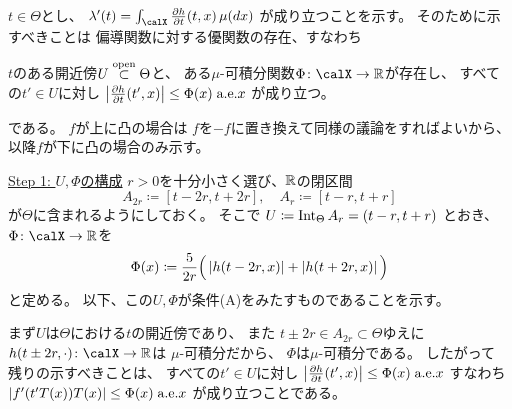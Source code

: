 \documentclass[report]{jlreq}
\begin{document}
\begin{answer}
    $t \in \Theta$とし、
    $\lambda'(t) = \int_\calX \deldel[h]{t} (t, x) \, \mu(dx)$
    が成り立つことを示す。
    そのために示すべきことは
    偏導関数に対する優関数の存在、すなわち
    \begin{description}
        \vspace{-1em}
        \item[(A)] $t$のある開近傍$U \stackrel{\text{open}}{\subset} \Theta$と、
            ある$\mu$-可積分関数$\Phi \colon \calX \to \R$が存在し、
            すべての$t' \in U$に対し
            $\myabs{
                \deldel[h]{t}(t', x)
            } \le \Phi(x) \; \text{a.e.$x$}$
            が成り立つ。
    \end{description}
    である。
    $f$が上に凸の場合は
    $f$を$-f$に置き換えて同様の議論をすればよいから、
    以降$f$が下に凸の場合のみ示す。

    \uline{Step 1: $U, \Phi$の構成} \quad
    $r > 0$を十分小さく選び、$\mathbb{R}$の閉区間
    \begin{equation}
        A_{2r} \coloneqq [t - 2r, t + 2r],
            \quad
            A_r \coloneqq [t - r, t + r]
    \end{equation}
    が$\Theta$に含まれるようにしておく。
    そこで
    $U \coloneqq \operatorname{Int}_\Theta A_r = (t - r, t + r)$
    とおき、
    $\Phi \colon \calX \to \R$を
    \begin{equation}
        \Phi(x)
            \coloneqq
            \frac{5}{2r}
            \Big(
                \left|{
                    h(t - 2r, x)
                }\right|
                +
                \left|{
                    h(t + 2r, x)
                }\right|
            \Big)
    \end{equation}
    と定める。
    以下、この$U, \Phi$が条件(A)をみたすものであることを示す。

    まず$U$は$\Theta$における$t$の開近傍であり、
    また
    $t \pm 2r \in A_{2r} \subset \Theta$ゆえに
    $h(t \pm 2r, \cdot) \colon \calX \to \R$は
    $\mu$-可積分だから、
    $\Phi$は$\mu$-可積分である。
    したがって
    残りの示すべきことは、
    すべての$t' \in U$に対し
    $\myabs{
        \deldel[h]{t}(t', x)
    }
        \le \Phi(x) \; \text{a.e.$x$}$
    すなわち
    $\left|{
        f'(t'T(x)) T(x)
    }\right|
        \le \Phi(x) \; \text{a.e.$x$}$
    が成り立つことである。


\end{answer}
\end{document}
